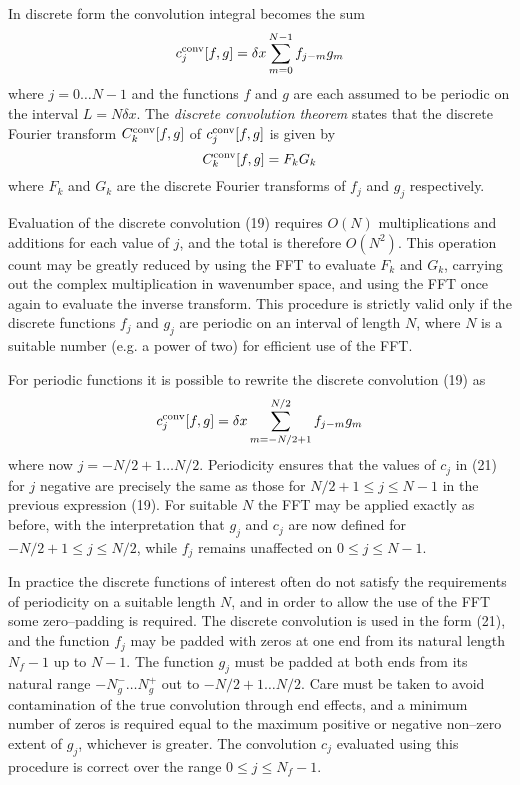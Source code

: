 \documentclass[dvips]{article}
\begin{document}
In discrete form the convolution integral becomes the sum
\begin{equation}
c^{\rm conv}_{j}[f,g] = \delta x \sum_{m=0}^{N-1} f_{j-m}g_{m}
\end{equation}
where $j = 0\ldots N-1$ and the functions $f$ and $g$ are each assumed to be
periodic on the interval $L = N\delta x$.  The {\it discrete convolution
theorem} states that the discrete Fourier transform
$C^{\rm conv}_{k}[f,g]$ of $c^{\rm conv}_{j}[f,g]$ is given by
\begin{equation}
C^{\rm conv}_{k}[f,g] = F_{k}G_{k}
\end{equation}
where $F_{k}$ and $G_{k}$ are the discrete Fourier transforms of $f_{j}$
and $g_{j}$ respectively.

Evaluation of the discrete convolution (19) requires $O(N)$
multiplications and additions for each value of $j$, and the total is
therefore $O(N^{2})$.  This operation count may be greatly reduced by using the
FFT to evaluate $F_{k}$ and $G_{k}$, carrying out the 
complex multiplication in wavenumber space, and using the FFT once
again to evaluate the inverse transform.  
This procedure is strictly valid only if the discrete functions $f_{j}$
and $g_{j}$ are periodic on an interval of length $N$, where $N$ is a
suitable number (e.g. a power of two) for efficient use of the FFT.

For periodic functions it is possible to rewrite the discrete
convolution (19) as
\begin{equation}
c^{\rm conv}_{j}[f,g] = \delta x \sum_{m=-N/2+1}^{N/2} f_{j-m}g_{m}
\end{equation}
where now $j = -N/2+1\ldots N/2$.  Periodicity ensures that the values
of $c_{j}$ in (21) for $j$ negative are precisely the same as those for
$N/2+1 \le j \le N-1$ in the previous expression (19).  For suitable $N$
the FFT may be applied exactly
as before, with the interpretation that $g_{j}$ and $c_{j}$ are now
defined for $-N/2+1 \le j \le N/2$, while $f_{j}$ remains unaffected on
$0 \le j \le N-1$.

In practice the discrete functions of interest often do not satisfy
the requirements of periodicity on a suitable length $N$, and in order
to allow the use of the FFT some zero--padding is required.  The
discrete convolution is used in the form (21), and the function
$f_{j}$ may be padded with zeros at one end from its natural length
$N_{f}-1$ up to $N-1$.
The function $g_{j}$ must be padded at both ends from its natural
range $-N_{g}^{-}\ldots N_{g}^{+}$ out to $-N/2+1\ldots N/2$.
Care must be taken to avoid contamination of the true convolution
through end effects, and a minimum number of zeros is required equal to
the maximum positive or negative non--zero extent of $g_{j}$, whichever is
greater.  The convolution $c_{j}$ evaluated using this procedure is
correct over the range $0\le j \le N_{f}-1$.  
\end{document}
